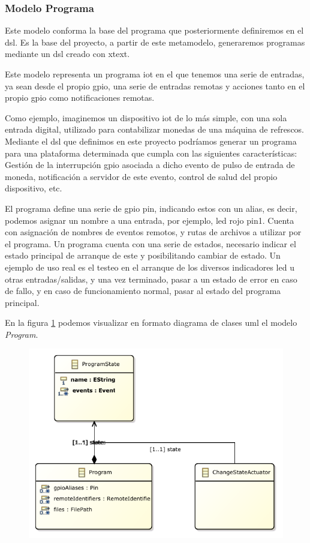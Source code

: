 \subsubsection{Modelo Programa}

Este modelo conforma la base del programa que posteriormente definiremos en el \gls{dsl}. Es la base del proyecto, a partir de este \gls{metamodelo}, generaremos programas mediante un \gls{dsl} creado con \gls{xtext}. 

Este modelo representa un programa \gls{iot} en el que tenemos una serie de entradas, ya sean desde el propio \gls{gpio}, una serie de entradas remotas y acciones tanto en el propio \gls{gpio} como notificaciones remotas.

Como ejemplo, imaginemos un dispositivo \gls{iot} de lo más simple, con una sola entrada digital, utilizado para contabilizar monedas de una máquina de refrescos. Mediante el \gls{dsl} que definimos en este proyecto podríamos generar un programa para una plataforma determinada que cumpla con las siguientes características: Gestión de la interrupción \gls{gpio} asociada a dicho evento de pulso de entrada de moneda, notificación a servidor de este evento,  control de salud del propio dispositivo, etc.

El programa define una serie de \gls{gpio} pin, indicando estos con un alias, es decir, podemos asignar un nombre a una entrada, por ejemplo, \gls{led} rojo \textrightarrow pin1. Cuenta con asignación de nombres de eventos remotos, y rutas de archivos a utilizar por el programa. Un programa cuenta con una serie de estados, necesario indicar el estado principal de arranque de este y posibilitando cambiar de estado. Un ejemplo de uso real es el testeo en el arranque de los diversos indicadores \gls{led} u otras entradas/salidas, y una vez terminado, pasar a un estado de error en caso de fallo, y en caso de funcionamiento normal, pasar al estado del programa principal.


En la figura \ref{fig:modelo_iot_programa_classes} podemos visualizar en formato diagrama de clases \gls{uml} el modelo \textit{Program}.

\begin{figure}
	\centering
    \includegraphics[height=0.3\textheight]{images/models/programs_class_diagram.pdf}
    \label{fig:modelo_iot_programa_classes}
\end{figure}

\clearpage
